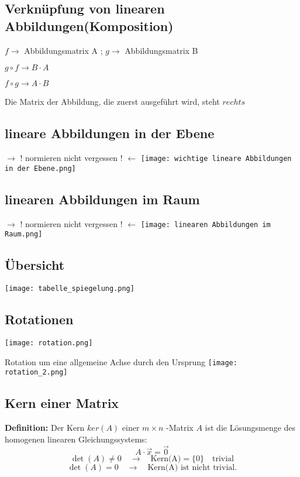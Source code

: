 \begin{multicols*}{3}
    \vfill\null
    \columnbreak
    \subsection{  Verknüpfung von linearen Abbildungen(Komposition)
    }
    {$f \to $ Abbildungsmatrix A ; $g \to $ Abbildungsmatrix B}

    {$g \circ f \to B \cdot A$  }

    {$f \circ g \to A \cdot B$  }

    {Die Matrix der Abbildung, die zuerst ausgeführt wird, steht $rechts$}

    \subsection{ lineare Abbildungen in der Ebene}
    {$\rightarrow $ $!$ normieren nicht vergessen $!$ $\leftarrow$}
    {\texttt{[image: wichtige lineare Abbildungen in der Ebene.png]}}

    \subsection{ linearen Abbildungen im Raum}
    {$\rightarrow $ $!$ normieren nicht vergessen $!$ $\leftarrow$}
    {\texttt{[image: linearen Abbildungen im Raum.png]}}

    
    \subsection{ Übersicht}
    {\texttt{[image: tabelle\_spiegelung.png]}}
    \vfill\null
    \columnbreak
    \subsection{ Rotationen}

    {\texttt{[image: rotation.png]}}

    {Rotation um eine allgemeine Achse durch den Ursprung}
    {\texttt{[image: rotation\_2.png]}}

    \subsection{ Kern einer Matrix}
    {\textbf{Definition:} Der Kern $ker(A)$ einer $m\times n$ -Matrix $A$ ist die Lösungsmenge des homogenen linearen
        Gleichungssystems: $$A\cdot \vec{x} = \vec{0}$$}
    {$$\det(A) \neq 0 \quad \rightarrow \quad \text{Kern(A)}=\{0\} \quad \text{trivial}$$}
    {$$\det(A)=0 \quad \rightarrow \quad \text{Kern(A) ist nicht trivial}.$$}


\end{multicols*}
